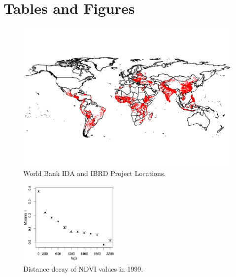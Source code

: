\documentclass{article}\usepackage[]{graphicx}\usepackage[]{color}
\makeatletter
\def\maxwidth{ %
  \ifdim\Gin@nat@width>\linewidth
    \linewidth
  \else
    \Gin@nat@width
  \fi
}
\newenvironment{knitrout}{}{}  %
\makeatother
\begin{document}
\begin{knitrout}
\newpage
\printbibliography

\newpage
\section{Tables and Figures}

\begin{figure}[H]
\begin{Schunk}

\includegraphics[width=\maxwidth]{figure/WLocs-1} \end{Schunk}
\caption{World Bank IDA and IBRD Project Locations.}
\label{WBLocs}
\vspace{25pt}
\end{figure}  

\begin{figure}[H]
\centering
 \includegraphics[width=0.45\textwidth]{pre_avg_NDVI_max_full}
\caption{Distance decay of NDVI values in 1999.}
  \label{DDFig}
\end{figure}


\end{knitrout}
\end{document}
